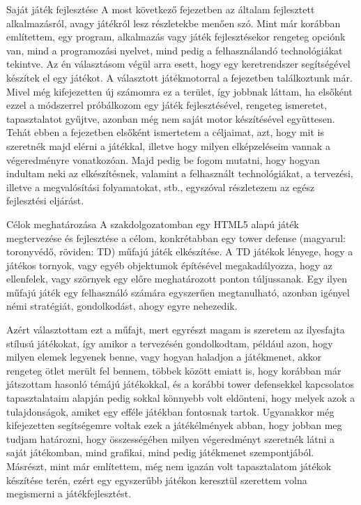 \begin{MyChapter}{Saját játék fejlesztése}
	A most következő fejezetben az általam fejlesztett alkalmazásról, avagy játékról lesz részletekbe menően szó. Mint már korábban említettem, egy program, alkalmazás vagy játék fejlesztésekor rengeteg opciónk van, mind a programozási nyelvet, mind pedig a felhasználandó technológiákat tekintve. Az én választásom végül arra esett, hogy egy keretrendszer segítségével készítek el egy játékot. A választott játékmotorral a  fejezetben találkoztunk már. Mivel még kifejezetten új számomra ez a terület, így jobbnak láttam, ha elsőként ezzel a módszerrel próbálkozom egy játék fejlesztésével, rengeteg ismeretet, tapasztalatot gyűjtve, azonban még nem saját motor készítésével együttesen.
	Tehát ebben a fejezetben elsőként ismertetem a céljaimat, azt, hogy mit is szeretnék majd elérni a játékkal, illetve hogy milyen elképzeléseim vannak a végeredményre vonatkozóan. Majd pedig be fogom mutatni, hogy hogyan indultam neki az elkészítésnek, valamint a felhasznált technológiákat, a tervezési, illetve a megvalósítási folyamatokat, stb., egyszóval részletezem az egész fejlesztési eljárást.
	
	\begin{MySection}{Célok meghatározása}
		A szakdolgozatomban egy HTML5 alapú játék megtervezése és fejlesztése a célom, konkrétabban egy tower defense (magyarul: toronyvédő, röviden: TD) műfajú játék elkészítése. A TD játékok lényege, hogy a játékos tornyok, vagy egyéb objektumok építésével megakadályozza, hogy az ellenfelek, vagy szörnyek egy előre meghatározott ponton túljussanak. Egy ilyen műfajú játék egy felhasználó számára egyszerűen megtanulható, azonban igényel némi stratégiát, gondolkodást, ahogy egyre nehezedik. 
		
		Azért választottam ezt a műfajt, mert egyrészt magam is szeretem az ilyesfajta stílusú játékokat, így amikor a tervezésén gondolkodtam, például azon, hogy milyen elemek legyenek benne, vagy hogyan haladjon a játékmenet, akkor rengeteg ötlet merült fel bennem, többek között emiatt is, hogy korábban már játszottam hasonló témájú játékokkal, és a korábbi tower defensekkel kapcsolatos tapasztalataim alapján pedig sokkal könnyebb volt eldönteni, hogy melyek azok a tulajdonságok, amiket egy efféle játékban fontosnak tartok. Ugyanakkor még kifejezetten segítségemre voltak ezek a játékélmények abban, hogy jobban meg tudjam határozni, hogy összességében milyen végeredményt szeretnék látni a saját játékomban, mind grafikai, mind pedig játékmenet szempontjából. Másrészt, mint már említettem, még nem igazán volt tapasztalatom játékok készítése terén, ezért egy egyszerűbb játékon keresztül szerettem volna megismerni a játékfejlesztést.
		

\end{MySection}
\end{MyChapter}
